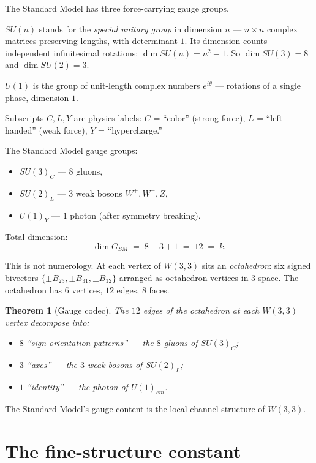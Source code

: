 \documentclass[11pt]{article}
\def\textbf#1{#1}%
\newtheorem*{theorem}{Theorem}
\newcommand{\W}{W(3,3)}
\begin{document}
The Standard Model has three force-carrying gauge groups.

\begin{mathnote}
\textbf{$SU(n)$} stands for the \emph{special unitary group} in dimension $n$ --- $n \times n$ complex matrices preserving lengths, with determinant $1$. Its dimension counts independent infinitesimal rotations: $\dim SU(n) = n^2 - 1$. So $\dim SU(3) = 8$ and $\dim SU(2) = 3$.

\textbf{$U(1)$} is the group of unit-length complex numbers $e^{i\theta}$ --- rotations of a single phase, dimension $1$.

Subscripts $C, L, Y$ are physics labels: $C$ = ``color'' (strong force), $L$ = ``left-handed'' (weak force), $Y$ = ``hypercharge.''
\end{mathnote}

The Standard Model gauge groups:
\begin{itemize}[leftmargin=2em]
\item $SU(3)_C$ --- $8$ gluons,
\item $SU(2)_L$ --- $3$ weak bosons $W^+, W^-, Z$,
\item $U(1)_Y$ --- $1$ photon (after symmetry breaking).
\end{itemize}

Total dimension:
\[
\dim G_{SM} \;=\; 8 + 3 + 1 \;=\; 12 \;=\; k.
\]

\textbf{This is not numerology.} At each vertex of $\W$ sits an \emph{octahedron}: six signed bivectors $\{\pm B_{23}, \pm B_{31}, \pm B_{12}\}$ arranged as octahedron vertices in $3$-space. The octahedron has $6$ vertices, $12$ edges, $8$ faces.

\begin{theorem}[Gauge codec]
The $12$ edges of the octahedron at each $\W$ vertex decompose into:
\begin{itemize}[leftmargin=2em]
\item $8$ ``sign-orientation patterns'' --- the $8$ gluons of $SU(3)_C$;
\item $3$ ``axes'' --- the $3$ weak bosons of $SU(2)_L$;
\item $1$ ``identity'' --- the photon of $U(1)_{em}$.
\end{itemize}
\end{theorem}

The Standard Model's gauge content is the local channel structure of $\W$.

\section{The fine-structure constant}
\end{document}
